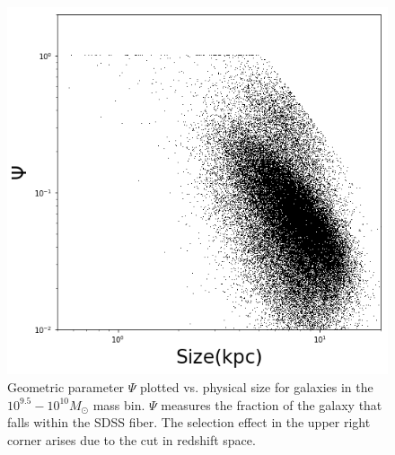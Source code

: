 \documentclass[iop]{emulateapj}
\begin{document}
\begin{figure}
	\centering
	\includegraphics[width=1.5 \columnwidth]{geometry_9_5.png}
	\caption{Geometric parameter $\Psi$ plotted vs. physical size for galaxies in the $10^{9.5} - 10^{10} M_{\odot}$ mass bin. $\Psi$ measures the fraction of the galaxy that falls within the SDSS fiber. The selection effect in the upper right corner arises due to the cut in redshift space.}
     \label{fig:geo}

\end{figure}
\end{document}
